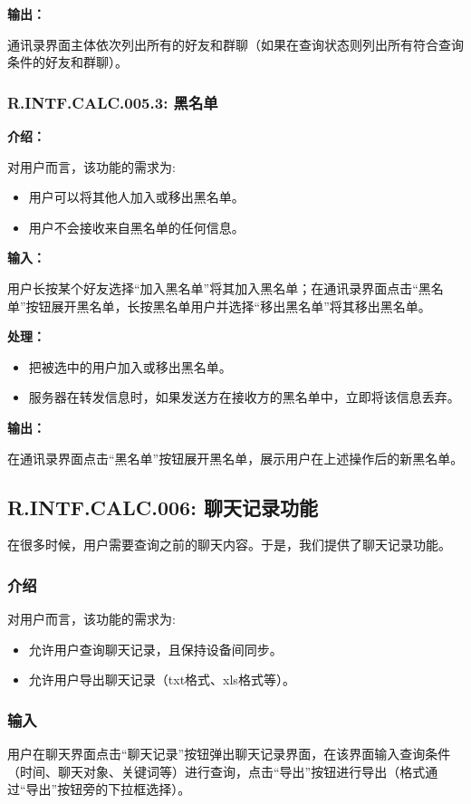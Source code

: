 \textbf{输出：}

通讯录界面主体依次列出所有的好友和群聊（如果在查询状态则列出所有符合查询条件的好友和群聊）。

\subsubsection{R.INTF.CALC.005.3: 黑名单}

\textbf{介绍：}

对用户而言，该功能的需求为:
\begin{itemize}
  \item 用户可以将其他人加入或移出黑名单。
  \item 用户不会接收来自黑名单的任何信息。
\end{itemize}

\textbf{输入：}

用户长按某个好友选择“加入黑名单”将其加入黑名单；在通讯录界面点击“黑名单”按钮展开黑名单，长按黑名单用户并选择“移出黑名单”将其移出黑名单。

\textbf{处理：}

\begin{itemize}
  \item 把被选中的用户加入或移出黑名单。
  \item 服务器在转发信息时，如果发送方在接收方的黑名单中，立即将该信息丢弃。
\end{itemize}

\textbf{输出：}

在通讯录界面点击“黑名单”按钮展开黑名单，展示用户在上述操作后的新黑名单。

\subsection{R.INTF.CALC.006: 聊天记录功能}
在很多时候，用户需要查询之前的聊天内容。于是，我们提供了聊天记录功能。
\subsubsection{介绍}
对用户而言，该功能的需求为:
\begin{itemize}
  \item 允许用户查询聊天记录，且保持设备间同步。
  \item 允许用户导出聊天记录（txt格式、xls格式等）。
\end{itemize}
\subsubsection{输入}
用户在聊天界面点击“聊天记录”按钮弹出聊天记录界面，在该界面输入查询条件（时间、聊天对象、关键词等）进行查询，点击“导出”按钮进行导出（格式通过“导出”按钮旁的下拉框选择）。
